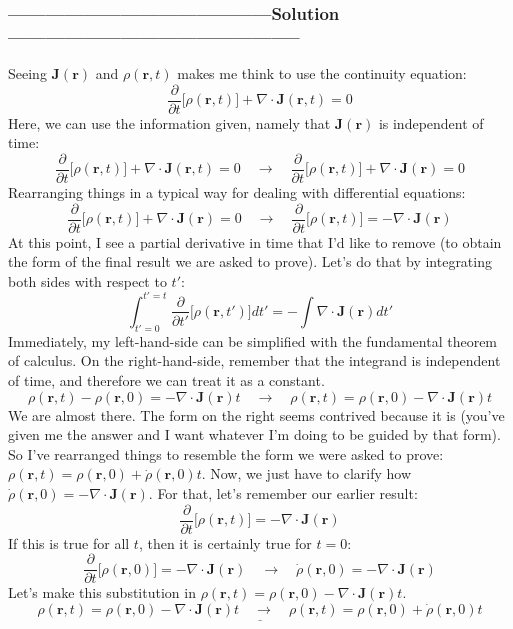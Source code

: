 \documentclass[a4paper,12pt]{article} %
\begin{document}
\subsubsection*{------------------------------------------Solution-----------------------------------------------}
Seeing $\mathbf{J}(\mathbf{r})$ and $\rho(\mathbf{r}, t)$ makes me think to use the continuity equation:
\begin{equation}
\frac{\partial}{\partial t}\Big[\rho(\mathbf{r}, t)\Big]+\nabla \cdot \mathbf{J}(\mathbf{r}, t)=0
	\label{eq:cont-eq}
\end{equation}
Here, we can use the information given, namely that $\mathbf{J}(\mathbf{r})$ is independent of time:
$$ \frac{\partial}{\partial t}\Big[\rho(\mathbf{r}, t)\Big]+\nabla \cdot \mathbf{J}(\mathbf{r}, t)=0 \quad\rightarrow\quad \frac{\partial}{\partial t}\Big[\rho(\mathbf{r}, t)\Big]+\nabla \cdot \mathbf{J}(\mathbf{r})=0 $$
Rearranging things in a typical way for dealing with differential equations:
$$ \frac{\partial}{\partial t}\Big[\rho(\mathbf{r}, t)\Big]+\nabla \cdot \mathbf{J}(\mathbf{r})=0 \quad\rightarrow\quad \frac{\partial}{\partial t}\Big[\rho(\mathbf{r}, t)\Big]=- \nabla \cdot \mathbf{J}(\mathbf{r})$$
At this point, I see a partial derivative in time that I'd like to remove (to obtain the form of the final result we are asked to prove). Let's do that by integrating both sides with respect to $t'$:
$$ \int_{t'=0}^{t'=t} \frac{\partial}{\partial t'}\Big[\rho(\mathbf{r}, t')\Big] dt' = -\int \nabla \cdot \mathbf{J}(\mathbf{r}) dt' $$
Immediately, my left-hand-side can be simplified with the fundamental theorem of calculus. On the right-hand-side, remember that the integrand is independent of time, and therefore we can treat it as a constant.
$$ \rho(\mathbf{r}, t) - \rho(\mathbf{r}, 0) = -\nabla\cdot\mathbf{J}(\mathbf{r})t \quad\rightarrow\quad \rho(\mathbf{r}, t) = \rho(\mathbf{r}, 0) -\nabla\cdot\mathbf{J}(\mathbf{r})t  $$
We are almost there. The form on the right seems contrived because it is (you've given me the answer and I want whatever I'm doing to be guided by that form). So I've rearranged things to resemble the form we were asked to prove: $\rho(\mathbf{r}, t)=\rho(\mathbf{r}, 0)+\dot{\rho}(\mathbf{r}, 0) t$. Now, we just have to clarify how $\dot{\rho}(\mathbf{r}, 0) = -\nabla\cdot\mathbf{J}(\mathbf{r})$. For that, let's remember our earlier result:
$$ \frac{\partial}{\partial t}\Big[\rho(\mathbf{r}, t)\Big]=-\nabla \cdot \mathbf{J}(\mathbf{r}) $$
If this is true for all $t$, then it is certainly true for $t=0$:
$$ \frac{\partial}{\partial t}\Big[\rho(\mathbf{r}, 0)\Big]=-\nabla \cdot \mathbf{J}(\mathbf{r}) \quad\rightarrow\quad \dot{\rho}(\mathbf{r}, 0)=-\nabla \cdot \mathbf{J}(\mathbf{r})  $$
Let's make this substitution in $\rho(\mathbf{r}, t)=\rho(\mathbf{r}, 0)-\nabla \cdot \mathbf{J}(\mathbf{r}) t$.
$$\underline{\boxed{\rho(\mathbf{r}, t)=\rho(\mathbf{r}, 0)-\nabla \cdot \mathbf{J}(\mathbf{r}) t \quad\rightarrow\quad \rho(\mathbf{r}, t)=\rho(\mathbf{r}, 0)+\dot{\rho}(\mathbf{r}, 0) t}} $$
\end{document}
